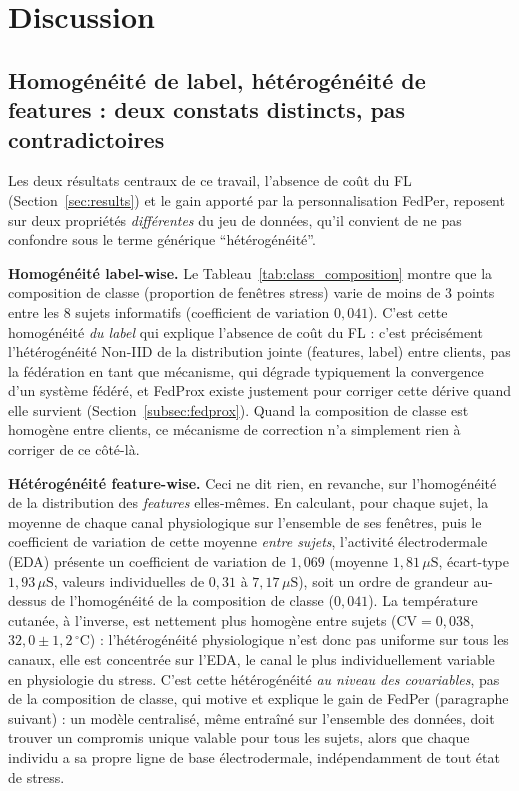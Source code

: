 \documentclass{acmart}
\begin{document}
\section{Discussion}
\label{sec:discussion}

\subsection{Homogénéité de label, hétérogénéité de features : deux
constats distincts, pas contradictoires}
\label{subsec:label_vs_feature}

Les deux résultats centraux de ce travail, l'absence de coût du FL
(Section~\ref{sec:results}) et le gain apporté par la personnalisation
FedPer, reposent sur deux propriétés \emph{différentes} du jeu de données,
qu'il convient de ne pas confondre sous le terme générique
``hétérogénéité''.

\textbf{Homogénéité label-wise.} Le Tableau~\ref{tab:class_composition}
montre que la composition de classe (proportion de fenêtres stress) varie de
moins de 3 points entre les 8 sujets informatifs (coefficient de variation
$0{,}041$). C'est cette homogénéité \emph{du label} qui explique l'absence
de coût du FL : c'est précisément l'hétérogénéité Non-IID de la
distribution jointe (features, label) entre clients, pas la fédération en
tant que mécanisme, qui dégrade typiquement la convergence d'un système
fédéré, et FedProx existe justement pour corriger cette dérive quand elle
survient (Section~\ref{subsec:fedprox}). Quand la composition de classe est
homogène entre clients, ce mécanisme de correction n'a simplement rien à
corriger de ce côté-là.

\textbf{Hétérogénéité feature-wise.} Ceci ne dit rien, en revanche, sur
l'homogénéité de la distribution des \emph{features} elles-mêmes. En
calculant, pour chaque sujet, la moyenne de chaque canal physiologique sur
l'ensemble de ses fenêtres, puis le coefficient de variation de cette
moyenne \emph{entre sujets}, l'activité électrodermale (EDA) présente un
coefficient de variation de $1{,}069$ (moyenne $1{,}81\,\mu\text{S}$,
écart-type $1{,}93\,\mu\text{S}$, valeurs individuelles de $0{,}31$ à
$7{,}17\,\mu\text{S}$), soit un ordre de grandeur au-dessus de
l'homogénéité de la composition de classe ($0{,}041$). La température
cutanée, à l'inverse, est nettement plus homogène entre sujets
($\text{CV}=0{,}038$, $32{,}0 \pm 1{,}2\,^{\circ}\text{C}$) : l'hétérogénéité
physiologique n'est donc pas uniforme sur tous les canaux, elle est
concentrée sur l'EDA, le canal le plus individuellement variable en
physiologie du stress. C'est cette hétérogénéité \emph{au niveau des
covariables}, pas de la composition de classe, qui motive et explique le
gain de FedPer (paragraphe suivant) : un modèle centralisé, même entraîné
sur l'ensemble des données, doit trouver un compromis unique valable pour
tous les sujets, alors que chaque individu a sa propre ligne de base
électrodermale, indépendamment de tout état de stress.
\end{document}
